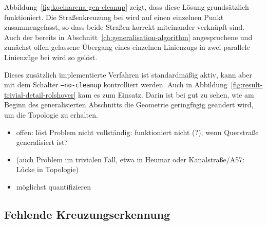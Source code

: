 \documentclass[../main/thesis.tex]{subfiles}
\begin{document}
Abbildung~\ref{fig:koelnarena-gen-cleanup} zeigt, dass diese Lösung grundsätzlich funktioniert.
Die Straßenkreuzung bei  wird auf einen einzelnen Punkt zusammengefasst, so dass beide Straßen korrekt miteinander verknüpft sind.
Auch der bereits in Abschnitt~\ref{ch:generalisation-algorithm} angesprochene und zunächst offen gelassene Übergang eines einzelnen Linienzugs in zwei parallele Linienzüge bei  wird so gelöst.

Dieses zusätzlich implementierte Verfahren ist standardmäßig aktiv, kann aber mit dem Schalter \texttt{--no-cleanup} kontrolliert werden.
Auch in Abbildung~\ref{fig:result-trivial-detail-rolshover} kam es zum Einsatz.
Darin ist bei  gut zu sehen, wie am Beginn des generalisierten Abschnitts die Geometrie geringfügig geändert wird, um die Topologie zu erhalten.

\begin{itemize}
\item offen: löst Problem nicht vollständig: funktioniert nicht (?), wenn Querstraße generalisiert ist?
\item (auch Problem im trivialen Fall, etwa in Heumar oder Kanalstraße/A57: Lücke in Topologie)
\item möglichst quantifizieren
\end{itemize}




\subsection{Fehlende Kreuzungserkennung}
\end{document}
